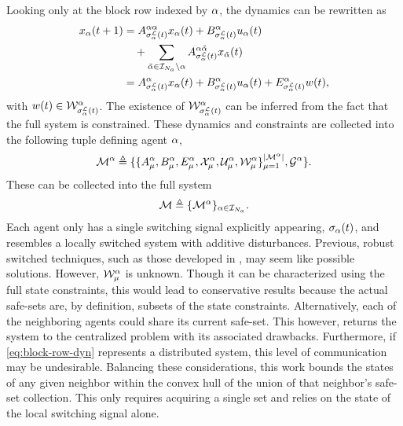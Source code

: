 Looking only at the block row indexed by $\alpha$, the dynamics can be rewritten as 
\begin{align}\label{eq:block-row-dyn}
x_\agentidx(t+1)&=A^{\agentidx\agentidx}_{\ssl[\agentidx](t)}x_\agentidx(t)+B^\agentidx_{\ssl[\agentidx](t)}u_\agentidx(t)\nonumber\\&\quad+\sum_{\tilde\agentidx\in\idxset{\numagents}\setminus \agentidx}A^{\agentidx\tilde\agentidx}_{\ssl[\agentidx](t)}x_{\tilde\agentidx}(t)\\
&=A^{\agentidx}_{\ssl[\agentidx](t)}x_\agentidx(t)+B^\agentidx_{\ssl[\agentidx](t)}u_\agentidx(t)+E_{\ssl[\agentidx](t)}^\agentidx w(t),\nonumber
\end{align}
with $w(t)\in\wcon[\ssl[\agentidx](t)]^\agentidx$. The existence of $\wcon[\ssl[\agentidx](t)]^\agentidx$ can be inferred from the fact that the full system is constrained. These dynamics and constraints are collected into the following tuple defining agent $\alpha$,
$$\agent{\agentidx}\triangleq\{\{A^{\agentidx}_{\modeidx},B^\agentidx_{\modeidx}, E_{\modeidx}^\agentidx,\xcon[\modeidx]^\agentidx,\ucon[\modeidx]^\agentidx, \wcon[\modeidx]^\agentidx\}_{\modeidx=1}^{\nummodes[\agentidx]},\graph^\agentidx\}.$$
These can be collected into the full system
\begin{equation}\label{eq:agent_notation}
\mathcal{M}\triangleq\{\mathcal{M}^{\alpha}\}_{\alpha\in\mathcal{I}_{{N_a}}}.
\end{equation}
Each agent only has a single switching signal explicitly appearing, ${\sigma}_{\alpha}(t)$, and resembles a locally switched system with additive disturbances. Previous, robust switched techniques, such as those developed in \cite{Lavaei2021}, may seem like possible solutions. However, $\wcon[\modeidx]^\agentidx$ is unknown. Though it can be characterized using the full state constraints, this would lead to conservative results because the actual safe-sets are, by definition, subsets of the state constraints. Alternatively, each of the neighboring agents could share its current safe-set. This however, returns the system to the centralized problem with its associated drawbacks. Furthermore, if \autoref{eq:block-row-dyn} represents a distributed system, this level of communication may be undesirable. Balancing these considerations, this work bounds the states of any given neighbor within the convex hull of the union of that neighbor's safe-set collection. This only requires acquiring a single set and relies on the state of the local switching signal alone. 